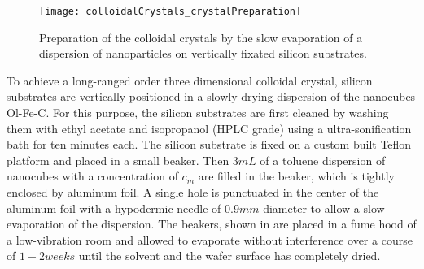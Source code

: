 \documentclass[\main/dresen_thesis.tex]{subfiles}
\begin{document}
  \begin{figure}[tb]
    \centering
    \texttt{[image: colloidalCrystals\_crystalPreparation]}
    \caption{\label{fig:colloidalCrystals:preparation:image}Preparation of the colloidal crystals by the slow evaporation of a dispersion of nanoparticles on vertically fixated silicon substrates.}
  \end{figure}

  To achieve a long-ranged order three dimensional colloidal crystal, silicon substrates are vertically positioned in a slowly drying dispersion of the nanocubes Ol-Fe-C.
  For this purpose, the silicon substrates are first cleaned by washing them with ethyl acetate and isopropanol (HPLC grade) using a ultra-sonification bath for ten minutes each.
  The silicon substrate is fixed on a custom built Teflon platform and placed in a small beaker.
  Then $3 \unit{mL}$ of a toluene dispersion of nanocubes with a concentration of $c_m$ are filled in the beaker, which is tightly enclosed by aluminum foil.
  A single hole is punctuated in the center of the aluminum foil with a hypodermic needle of $0.9 \unit{mm}$ diameter to allow a slow evaporation of the dispersion.
  The beakers, shown in  are placed in a fume hood of a low-vibration room and allowed to evaporate without interference over a course of $1 - 2 \unit{weeks}$ until the solvent and the wafer surface has completely dried.
\end{document}
